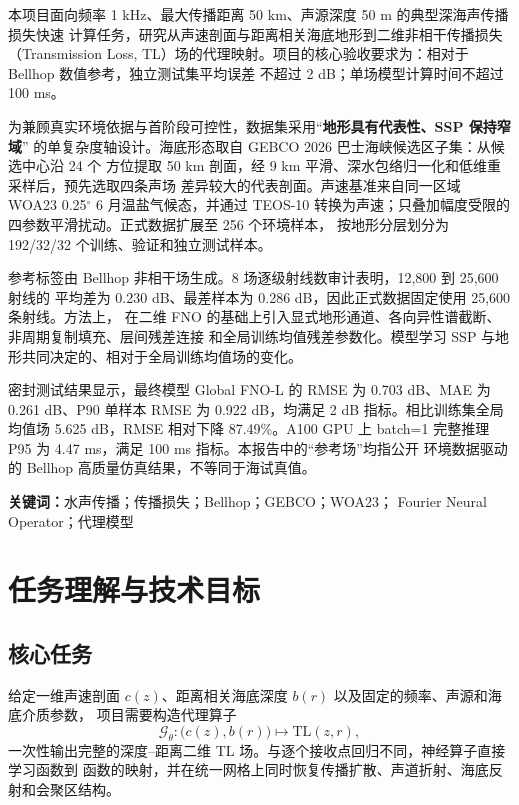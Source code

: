 \documentclass[UTF8,11pt]{ctexart}
\newcommand{\TL}{\mathrm{TL}}
\newcommand{\BestModel}{Global FNO-L}
\newcommand{\BestRMSE}{0.703}
\newcommand{\BestMAE}{0.261}
\newcommand{\BestPninety}{0.922}
\newcommand{\GlobalBaseline}{5.625}
\newcommand{\RelativeReduction}{87.49}
\newcommand{\GpuPninetyfive}{4.47}
\begin{document}
本项目面向频率 1 kHz、最大传播距离 50 km、声源深度 50 m 的典型深海声传播损失快速
计算任务，研究从声速剖面与距离相关海底地形到二维非相干传播损失（Transmission Loss,
TL）场的代理映射。项目的核心验收要求为：相对于 Bellhop 数值参考，独立测试集平均误差
不超过 2 dB；单场模型计算时间不超过 100 ms。

为兼顾真实环境依据与首阶段可控性，数据集采用“\textbf{地形具有代表性、SSP 保持窄域}”
的单复杂度轴设计。海底形态取自 GEBCO 2026 巴士海峡候选区子集：从候选中心沿 24 个
方位提取 50 km 剖面，经 9 km 平滑、深水包络归一化和低维重采样后，预先选取四条声场
差异较大的代表剖面。声速基准来自同一区域 WOA23 0.25$^\circ$ 6 月温盐气候态，并通过
TEOS-10 转换为声速；只叠加幅度受限的四参数平滑扰动。正式数据扩展至 256 个环境样本，
按地形分层划分为 192/32/32 个训练、验证和独立测试样本。

参考标签由 Bellhop 非相干场生成。8 场逐级射线数审计表明，12,800 到 25,600 射线的
平均差为 0.230 dB、最差样本为 0.286 dB，因此正式数据固定使用 25,600 条射线。方法上，
在二维 FNO 的基础上引入显式地形通道、各向异性谱截断、非周期复制填充、层间残差连接
和全局训练均值残差参数化。模型学习 SSP 与地形共同决定的、相对于全局训练均值场的变化。

密封测试结果显示，最终模型 \BestModel{} 的 RMSE 为 \BestRMSE{} dB、MAE 为
\BestMAE{} dB、P90 单样本 RMSE 为 \BestPninety{} dB，均满足 2 dB 指标。相比训练集全局
均值场 \GlobalBaseline{} dB，RMSE 相对下降 \RelativeReduction{}\%。A100 GPU 上 batch=1
完整推理 P95 为 \GpuPninetyfive{} ms，满足 100 ms 指标。本报告中的“参考场”均指公开
环境数据驱动的 Bellhop 高质量仿真结果，不等同于海试真值。

\vspace{0.5cm}
\noindent\textbf{关键词：}水声传播；传播损失；Bellhop；GEBCO；WOA23；
Fourier Neural Operator；代理模型

\clearpage
\tableofcontents
\clearpage
{}

\section{任务理解与技术目标}

\subsection{核心任务}

给定一维声速剖面 $c(z)$、距离相关海底深度 $b(r)$ 以及固定的频率、声源和海底介质参数，
项目需要构造代理算子
\begin{equation}
  \mathcal{G}_\theta:\big(c(z),b(r)\big)\longmapsto \TL(z,r),
\end{equation}
一次性输出完整的深度--距离二维 TL 场。与逐个接收点回归不同，神经算子直接学习函数到
函数的映射，并在统一网格上同时恢复传播扩散、声道折射、海底反射和会聚区结构。
\end{document}
